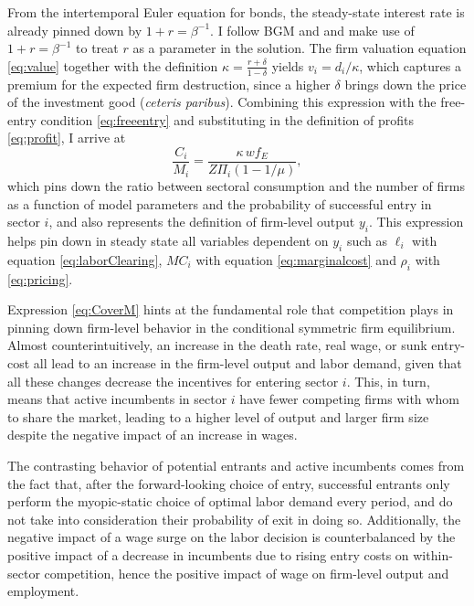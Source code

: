 \documentclass[a4paper,12pt]{article} %
\numberwithin{equation}{section} %
\numberwithin{figure}{section}
\numberwithin{table}{section}
\begin{document}
From the intertemporal Euler equation for bonds, the steady-state interest rate is already pinned down by $1+r = \beta^{-1}$. I follow 
BGM and \textcite{campbell1994inspecting} and make use of $1+r = \beta^{-1}$ to treat $r$ as a parameter in the solution. The firm valuation
equation \eqref{eq:value} together with the definition $\kappa=\frac{r+\delta}{1-\delta}$ yields $v_i = d_i/\kappa$, which captures a premium for
the expected firm destruction, since a higher $\delta$ brings down the price of the investment good (\textit{ceteris paribus}). Combining 
this expression with the free-entry condition \eqref{eq:freeentry} and substituting in the definition of profits \eqref{eq:profit}, I arrive at  
\begin{equation}
  \frac{C_i}{M_i}=\frac{\kappa\,w f_E}{Z\Pi_i(1-1/\mu)}, \label{eq:CoverM}
\end{equation}
which pins down the ratio between sectoral consumption and the number of firms as a function of model parameters and the probability of successful 
entry in sector $i$, and also represents the definition of firm-level output $y_i$. This expression helps pin down in steady state all 
variables dependent on $y_i$ such as $\ell_i$ with equation \eqref{eq:laborClearing}, $MC_i$ with equation \eqref{eq:marginalcost} and 
$\rho_i$ with \eqref{eq:pricing}. 

Expression \eqref{eq:CoverM} hints at the fundamental role that competition plays in pinning down firm-level
behavior in the conditional symmetric firm equilibrium. Almost counterintuitively, an increase in the death rate, real wage, or sunk entry-cost all lead
to an increase in the firm-level output and labor demand, given that all these changes decrease the incentives for entering sector $i$. This, in turn,
means that active incumbents in sector $i$ have fewer competing firms with whom to share the market, leading to a higher level of output and larger
firm size despite the negative impact of an increase in wages. 

The contrasting behavior of potential entrants and active incumbents comes from the fact that, after the forward-looking choice of entry, 
successful entrants only perform the myopic-static choice of optimal labor demand every period, and do not take into consideration their probability
of exit in doing so. Additionally, the negative impact of a wage surge on the labor decision is counterbalanced by the 
positive impact of a decrease in incumbents due to rising entry costs on within-sector competition, hence the positive impact of wage on firm-level output 
and employment.
\end{document}
